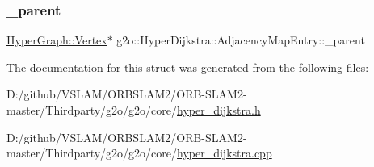 \subsubsection{\texorpdfstring{\+\_\+parent}{\_parent}}
{\footnotesize\ttfamily \mbox{\hyperlink{classg2o_1_1_hyper_graph_1_1_vertex}{Hyper\+Graph\+::\+Vertex}}$\ast$ g2o\+::\+Hyper\+Dijkstra\+::\+Adjacency\+Map\+Entry\+::\+\_\+parent\hspace{0.3cm}{\ttfamily [protected]}}



The documentation for this struct was generated from the following files\+:\begin{DoxyCompactItemize}
\item 
D\+:/github/\+V\+S\+L\+A\+M/\+O\+R\+B\+S\+L\+A\+M2/\+O\+R\+B-\/\+S\+L\+A\+M2-\/master/\+Thirdparty/g2o/g2o/core/\mbox{\hyperlink{hyper__dijkstra_8h}{hyper\+\_\+dijkstra.\+h}}\item 
D\+:/github/\+V\+S\+L\+A\+M/\+O\+R\+B\+S\+L\+A\+M2/\+O\+R\+B-\/\+S\+L\+A\+M2-\/master/\+Thirdparty/g2o/g2o/core/\mbox{\hyperlink{hyper__dijkstra_8cpp}{hyper\+\_\+dijkstra.\+cpp}}\end{DoxyCompactItemize}
